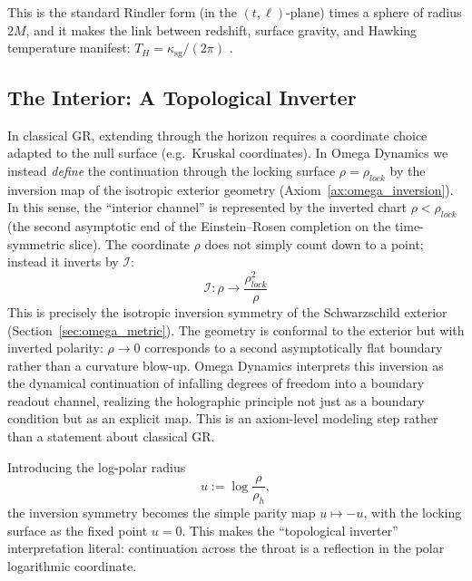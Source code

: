 This is the standard Rindler form (in the $(t,\ell)$-plane) times a sphere of radius $2M$, and it makes the link between redshift, surface gravity, and Hawking temperature manifest: $T_H=\kappa_{\mathrm{sg}}/(2\pi)$ \cite{Wald1984,Hawking1975,HartleHawking1976,BirrellDavies1982,Wald1994,Unruh1976}.

\subsection{The Interior: A Topological Inverter}
In classical GR, extending through the horizon requires a coordinate choice adapted to the null surface (e.g.\ Kruskal coordinates). In Omega Dynamics we instead \emph{define} the continuation through the locking surface $\rho=\rho_{lock}$ by the inversion map of the isotropic exterior geometry (Axiom~\ref{ax:omega_inversion}). In this sense, the ``interior channel'' is represented by the inverted chart $\rho<\rho_{lock}$ (the second asymptotic end of the Einstein--Rosen completion on the time-symmetric slice). The coordinate $\rho$ does not simply count down to a point; instead it inverts by $\mathcal{I}$:
\begin{equation}
	    \mathcal{I}: \rho \to \frac{\rho_{lock}^2}{\rho}
\end{equation}
This is precisely the isotropic inversion symmetry of the Schwarzschild exterior (Section~\ref{sec:omega_metric}). The geometry is conformal to the exterior but with inverted polarity: $\rho\to 0$ corresponds to a second asymptotically flat boundary rather than a curvature blow-up. Omega Dynamics interprets this inversion as the dynamical continuation of infalling degrees of freedom into a boundary readout channel, realizing the holographic principle \cite{Susskind1995, Maldacena1998} not just as a boundary condition but as an explicit map.
This is an axiom-level modeling step rather than a statement about classical GR.

\begin{remark}
Introducing the log-polar radius
\begin{equation}
  u:=\log\frac{\rho}{\rho_h},
\end{equation}
the inversion symmetry becomes the simple parity map $u\mapsto -u$, with the locking surface as the fixed point $u=0$.
This makes the ``topological inverter'' interpretation literal: continuation across the throat is a reflection in the polar logarithmic coordinate.
\end{remark}

